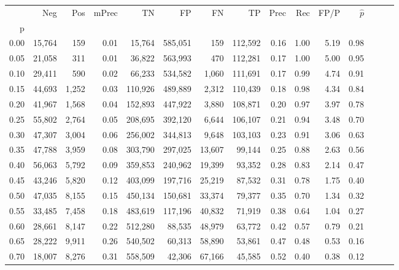 \begin{tabular}{rrrrrrrrrrrrrrr}
\toprule
{} &     Neg &    Pos & mPrec &       TN &       FP &       FN &       TP &  Prec &   Rec &  FP/P & $\hat{p}$ \\
p    &         &        &       &          &          &          &          &       &       &       &           \\
\midrule
0.00 &  15,764 &    159 &  0.01 &   15,764 &  585,051 &      159 &  112,592 &  0.16 &  1.00 &  5.19 &      0.98 \\
0.05 &  21,058 &    311 &  0.01 &   36,822 &  563,993 &      470 &  112,281 &  0.17 &  1.00 &  5.00 &      0.95 \\
0.10 &  29,411 &    590 &  0.02 &   66,233 &  534,582 &    1,060 &  111,691 &  0.17 &  0.99 &  4.74 &      0.91 \\
0.15 &  44,693 &  1,252 &  0.03 &  110,926 &  489,889 &    2,312 &  110,439 &  0.18 &  0.98 &  4.34 &      0.84 \\
0.20 &  41,967 &  1,568 &  0.04 &  152,893 &  447,922 &    3,880 &  108,871 &  0.20 &  0.97 &  3.97 &      0.78 \\
0.25 &  55,802 &  2,764 &  0.05 &  208,695 &  392,120 &    6,644 &  106,107 &  0.21 &  0.94 &  3.48 &      0.70 \\
0.30 &  47,307 &  3,004 &  0.06 &  256,002 &  344,813 &    9,648 &  103,103 &  0.23 &  0.91 &  3.06 &      0.63 \\
0.35 &  47,788 &  3,959 &  0.08 &  303,790 &  297,025 &   13,607 &   99,144 &  0.25 &  0.88 &  2.63 &      0.56 \\
0.40 &  56,063 &  5,792 &  0.09 &  359,853 &  240,962 &   19,399 &   93,352 &  0.28 &  0.83 &  2.14 &      0.47 \\
0.45 &  43,246 &  5,820 &  0.12 &  403,099 &  197,716 &   25,219 &   87,532 &  0.31 &  0.78 &  1.75 &      0.40 \\
0.50 &  47,035 &  8,155 &  0.15 &  450,134 &  150,681 &   33,374 &   79,377 &  0.35 &  0.70 &  1.34 &      0.32 \\
0.55 &  33,485 &  7,458 &  0.18 &  483,619 &  117,196 &   40,832 &   71,919 &  0.38 &  0.64 &  1.04 &      0.27 \\
0.60 &  28,661 &  8,147 &  0.22 &  512,280 &   88,535 &   48,979 &   63,772 &  0.42 &  0.57 &  0.79 &      0.21 \\
0.65 &  28,222 &  9,911 &  0.26 &  540,502 &   60,313 &   58,890 &   53,861 &  0.47 &  0.48 &  0.53 &      0.16 \\
0.70 &  18,007 &  8,276 &  0.31 &  558,509 &   42,306 &   67,166 &   45,585 &  0.52 &  0.40 &  0.38 &      0.12 \\

\end{tabular}
